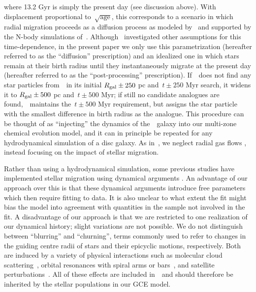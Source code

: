 \documentclass[ms.tex]{subfiles}
\begin{document}
where 13.2 Gyr is simply the present day (see discussion above).
With displacement proportional to~$\sqrt{\text{age}}$, this corresponds to a
scenario in which radial migration proceeds as a diffusion process as modeled
by~\citet{Frankel2018, Frankel2019} and supported by the N-body simulations
of~\citet*{Brunetti2011}.
Although~\citet{Johnson2021} investigated other assumptions for this
time-dependence, in the present paper we only use this parametrization
(hereafter referred to as the ``diffusion'' prescription) and an idealized one
in which stars remain at their birth radius until they instantaneously migrate
at the present day (hereafter referred to as the ``post-processing''
prescription).
If~\vice~does not find any star particles from~\hsim~in its initial
$R_\text{gal} \pm 250$ pc and~$t \pm 250$ Myr search, it widens it to
$R_\text{gal} \pm 500$ pc and~$t \pm 500$ Myr; if still no candidate analogues are
found,~\vice~maintains the~$t \pm 500$ Myr requirement, but assigns the star
particle with the smallest difference in birth radius as the analogue.
This procedure can be thought of as ``injecting'' the dynamics of
the~\hsim~galaxy into our multi-zone chemical evolution model, and it can in
principle be repeated for any hydrodynamical simulation of a disc galaxy.
As in~\citet{Johnson2021}, we neglect radial gas flows
\citep[e.g.][]{Lacey1985, Bilitewski2012, Vincenzo2020}, instead focusing on
the impact of stellar migration.
\par
Rather than using a hydrodynamical simulation, some previous studies have
implemented stellar migration using dynamical arguments
\citep[e.g.][]{Schoenrich2009, Sharma2021}.
An advantage of our approach over this is that these dynamical arguments
introduce free parameters which then require fitting to data.
It is also unclear to what extent the fit might bias the model into agreement
with quantities in the sample not involved in the fit.
A disadvantage of our approach is that we are restricted to one realization of
our dynamical history; slight variations are not possible.
We do not distinguish between ``blurring'' and ``churning'', terms commonly
used to refer to changes in the guiding centre radii of stars and their
epicyclic motions, respectively.
Both are induced by a variety of physical interactions such as molecular cloud
scattering~\citep{Mihalas1981, Jenkins1990, Jenkins1992}, orbital resonances
with spiral arms or bars~\citep{Sellwood2002, Minchev2011}, and satellite
perturbations~\citep*{Bird2012}.
All of these effects are included in~\hsim~and should therefore be inherited by
the stellar populations in our GCE model.
\end{document}
